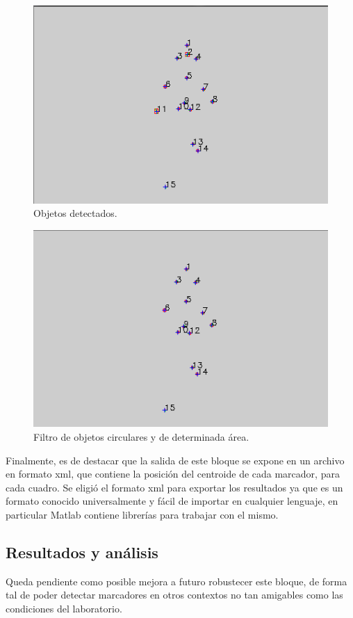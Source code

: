 \begin{figure}[H]
\begin{center}
\includegraphics[scale=0.7]{img/peladoFondoAzul_blobs.png}
\end{center}
\caption{Objetos detectados.}
\label{peladoBlobs}
\end{figure}

\begin{figure}[H]
\begin{center}
\includegraphics[scale=0.7]{img/peladoFondoAzul_circulos.png}
\end{center}
\caption{Filtro de objetos circulares y de determinada área.}
\label{peladoCircular}
\end{figure}

Finalmente, es de destacar que la salida de este bloque se expone en un archivo en formato xml, que contiene la posición del centroide de cada marcador, para cada cuadro. Se eligió el formato xml para exportar los resultados ya que es un formato conocido universalmente y fácil de importar en cualquier lenguaje, en particular Matlab contiene librerías para trabajar con el mismo.

\subsection{Resultados y análisis}
Queda pendiente como posible mejora a futuro robustecer este bloque, de forma tal de poder detectar marcadores en otros contextos no tan amigables como las condiciones del laboratorio.
